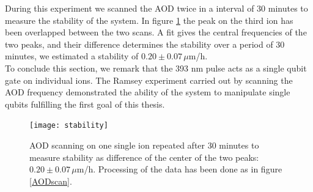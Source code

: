 During this experiment we scanned the AOD twice in a interval of 30 minutes to measure the stability of the system. In figure \ref{fig:stability} the peak on the third ion has been overlapped between the two scans. A fit gives the central frequencies of the two peaks, and their difference determines the stability over a period of 30 minutes, we estimated a stability of $0.20\pm 0.07\,\mu$m/h.\\
To conclude this section, we remark that the 393 nm pulse acts as a single qubit gate on individual ions. The Ramsey experiment carried out by scanning the AOD frequency demonstrated the ability of the system to manipulate single qubits fulfilling the first goal of this thesis.
\begin{figure}
\centering
\texttt{[image: stability]}
\caption{AOD scanning on one single ion repeated after 30 minutes to measure stability as difference of the center of the two peaks: $0.20\pm 0.07\,\mu$m/h. Processing of the data has been done as in figure \ref{AODscan}.}
\label{fig:stability}
\end{figure}
